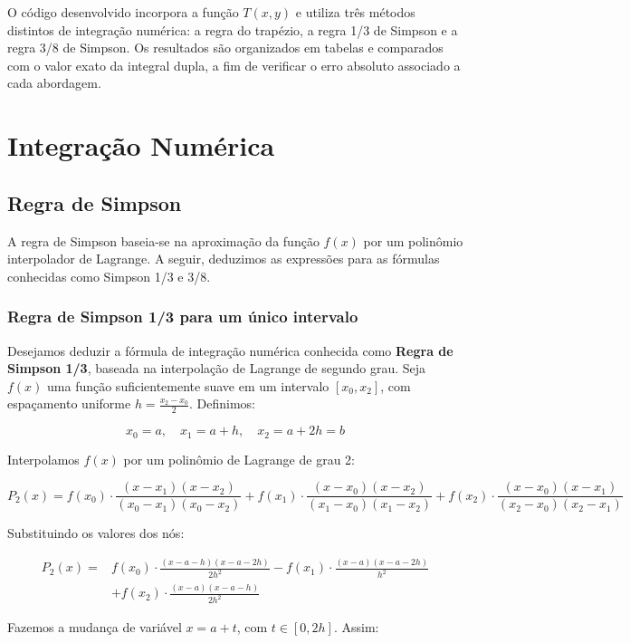 \documentclass[12pt]{article}
\begin{document}
O código desenvolvido incorpora a função $T(x,y)$ e utiliza três métodos distintos de integração numérica: a regra do trapézio, a regra 1/3 de Simpson e a regra 3/8 de Simpson. Os resultados são organizados em tabelas e comparados com o valor exato da integral dupla, a fim de verificar o erro absoluto associado a cada abordagem.

\section{Integração Numérica}

\subsection{Regra de Simpson}

A regra de Simpson baseia-se na aproximação da função $f(x)$ por um polinômio interpolador de Lagrange. A seguir, deduzimos as expressões para as fórmulas conhecidas como Simpson 1/3 e 3/8.

\subsubsection*{Regra de Simpson 1/3 para um único intervalo}

Desejamos deduzir a fórmula de integração numérica conhecida como \textbf{Regra de Simpson 1/3}, baseada na interpolação de Lagrange de segundo grau. Seja \( f(x) \) uma função suficientemente suave em um intervalo \( [x_0, x_2] \), com espaçamento uniforme \( h = \frac{x_2 - x_0}{2} \). Definimos:

\[
x_0 = a, \quad x_1 = a + h, \quad x_2 = a + 2h = b
\]

Interpolamos \( f(x) \) por um polinômio de Lagrange de grau 2:

\[
P_2(x) = f(x_0) \cdot \frac{(x - x_1)(x - x_2)}{(x_0 - x_1)(x_0 - x_2)}
+ f(x_1) \cdot \frac{(x - x_0)(x - x_2)}{(x_1 - x_0)(x_1 - x_2)}
+ f(x_2) \cdot \frac{(x - x_0)(x - x_1)}{(x_2 - x_0)(x_2 - x_1)}
\]

Substituindo os valores dos nós:

\[
\begin{aligned}
P_2(x) = & f(x_0) \cdot \frac{(x - a - h)(x - a - 2h)}{2h^2}
- f(x_1) \cdot \frac{(x - a)(x - a - 2h)}{h^2} \\
& + f(x_2) \cdot \frac{(x - a)(x - a - h)}{2h^2}
\end{aligned}
\]

Fazemos a mudança de variável \( x = a + t \), com \( t \in [0, 2h] \). Assim:
\end{document}
